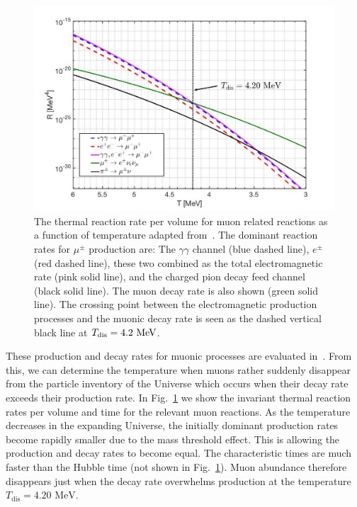 \documentclass[universe,article,submit,moreauthors,pdftex,a4paper]{Definitions/mdpi}
\newcommand{\MeV}{\text{ MeV}}
\newcommand*{\rf}[1]{Fig.~{\ref{#1}}}
\newcommand*{\xblue}{\color{black}}
\begin{document}
\begin{figure}[ht]
\centering
\includegraphics[width=0.9\columnwidth]{./plots/MuonRate_new2.jpg}
\caption{The thermal reaction rate per volume for muon related reactions as a function of temperature adapted from~\cite{Rafelski:2021aey}. {\xblue The dominant reaction rates for $\mu^\pm$ production are: The $\gamma\gamma$ channel (blue dashed line), $e^{\pm}$ (red dashed line), these two combined as the total electromagnetic rate (pink solid line), and the charged pion decay feed channel (black solid line). The muon decay rate is also shown (green solid line). The crossing point between the electromagnetic production processes and the muonic decay rate is seen as the dashed vertical black line at $T_{\rm dis}=4.2\MeV$.}}
\label{muon_fig} 
\end{figure}

{\xblue These production and decay rates for muonic processes are evaluated in~\cite{Rafelski:2021aey}. From this, we can determine the temperature when muons rather suddenly disappear from the particle inventory of the Universe which occurs when their decay rate exceeds their production rate.} In \rf{muon_fig} we show the invariant thermal reaction rates per volume and time for the relevant muon reactions.  {\xblue As the temperature decreases in the expanding Universe, the initially dominant production rates become rapidly smaller due to the mass threshold effect. This is allowing the production and decay rates to become equal.  The characteristic times are much faster than the Hubble time (not shown in \rf{muon_fig}). Muon abundance therefore disappears just when the decay rate overwhelms production at the temperature $T_\mathrm{dis} = 4.20\MeV$.}
\end{document}
